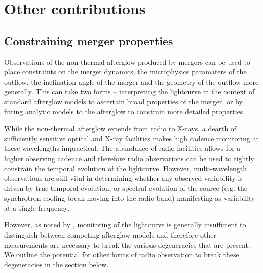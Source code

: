 \section{Other contributions}
\label{sec:other_contributions}

\subsection{Constraining merger properties}
\label{subsec:constraining_merger_properties}
Observations of the non-thermal afterglow produced by mergers can be used to place constraints on the merger dynamics, the microphysics paramaters of the outflow, the inclination angle of the merger and the geometry of the outflow more generally. This can take two forms -- interpreting the lightcurve in the context of standard afterglow models \citep{1998ApJ...497L..17S,1999ApJ...519L..17S} to ascertain broad properties of the merger, or by fitting analytic models to the afterglow to constrain more detailed properties.

While the non-thermal afterglow extends from radio to X-rays, a dearth of sufficiently sensitive optical and X-ray facilities makes high cadence monitoring at these wavelengths impractical. The abundance of radio facilities allows for a higher observing cadence and therefore radio observations can be used to tightly constrain the temporal evolution of the lightcurve. However, multi-wavelength observations are still vital in determining whether any observed variability is driven by true temporal evolution, or spectral evolution of the source (e.g. the synchrotron cooling break moving into the radio band) manifesting as variability at a single frequency.

However, as noted by \citet{2018MNRAS.478..407N}, monitoring of the lightcurve is generally insufficient to distinguish between competing afterglow models and therefore other measurements are necessary to break the various degeneracies that are present. We outline the potential for other forms of radio observation to break these degeneracies in the section below.


\vspace{-12pt}
